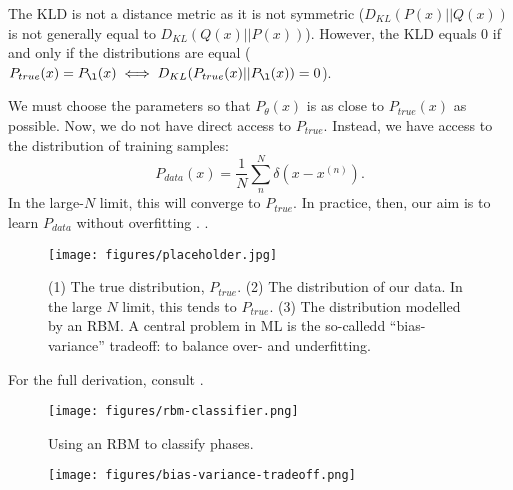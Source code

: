 The KLD is not a distance metric as it is not symmetric
($D_{KL}(P(x)||Q(x))$ is not generally equal to
$D_{KL}(Q(x)||P(x))$). However, the KLD equals $0$ if and only if the
distributions are equal
($P_{true}(x)=P_{\l}(x) \iff D_{KL}(P_{true}(x)||P_{\l}(x)) =0$).

We must choose the parameters so that $P_\theta(x)$ is as close to
$P_{true}(x)$ as possible. Now, we do not have direct access to
$P_{true}$. Instead, we have access to the distribution of training
samples:%
\begin{equation}%
  P_{data}(x)=\frac{1}{N}\sum_n^N \delta(x-x^{(n)}).
\end{equation}%
In the large-$N$ limit, this will converge to $P_{true}$. In practice,
then, our aim is to learn $P_{data}$ without overfitting
.  .

\begin{figure}[ht]
  \centering
  \texttt{[image: figures/placeholder.jpg]}
  \caption{(1) The true distribution, $P_{true}$. (2) The distribution
    of our data. In the large $N$ limit, this tends to $P_{true}$. (3)
    The distribution modelled by an RBM\@. A central problem in ML is
    the so-calledd ``bias-variance'' tradeoff: to balance over- and
    underfitting.\label{fig:fitting-dist} }
\end{figure}

For the full derivation, consult .




\begin{figure}[ht]
  \centering
  \texttt{[image: figures/rbm-classifier.png]}
  \caption{Using an RBM to classify phases.\label{fig:rbm-classifier}
  }
\end{figure}


\begin{figure}[ht]
  \centering
  \texttt{[image: figures/bias-variance-tradeoff.png]}
  \caption{\label{fig:bias-variance-tradeoff} }
\end{figure}


